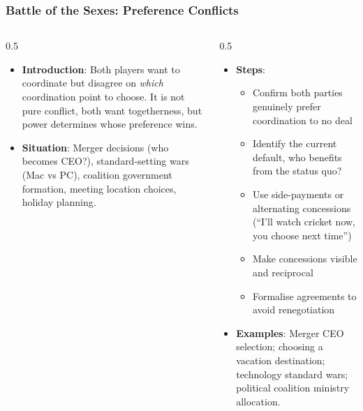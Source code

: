 \begin{frame}[fragile]\frametitle{Battle of the Sexes: Preference Conflicts}
\begin{columns}
    \begin{column}[T]{0.5\linewidth}
      \begin{itemize}
        \item \textbf{Introduction}: Both players want to coordinate but disagree on \textit{which} coordination point to choose. It is not pure conflict, both want togetherness, but power determines whose preference wins.
        \item \textbf{Situation}: Merger decisions (who becomes CEO?), standard-setting wars (Mac vs PC), coalition government formation, meeting location choices, holiday planning.
      \end{itemize}
    \end{column}
    \begin{column}[T]{0.5\linewidth}
      \begin{itemize}
        \item \textbf{Steps}:
        \begin{itemize}
          \item Confirm both parties genuinely prefer coordination to no deal
          \item Identify the current default, who benefits from the status quo?
          \item Use side-payments or alternating concessions (``I'll watch cricket now, you choose next time'')
          \item Make concessions visible and reciprocal
          \item Formalise agreements to avoid renegotiation
        \end{itemize}\item \textbf{Examples}: Merger CEO selection; choosing a vacation destination; technology standard wars; political coalition ministry allocation.
      \end{itemize}
    \end{column}
  \end{columns}
\end{frame}


